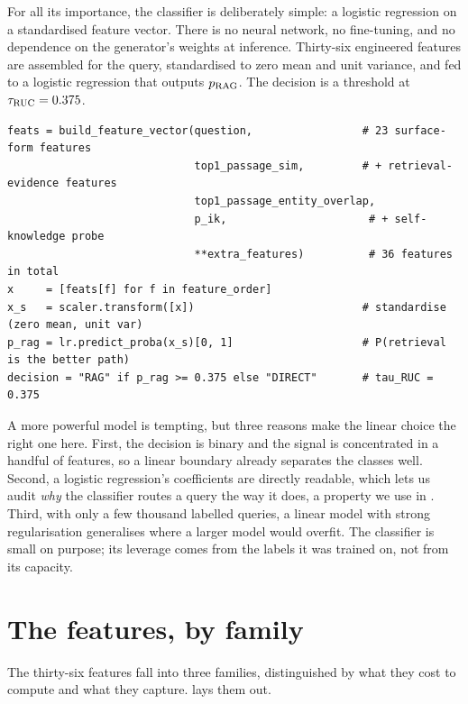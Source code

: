 For all its importance, the classifier is deliberately simple: a logistic regression
on a standardised feature vector. There is no neural network, no fine-tuning, and no
dependence on the generator's weights at inference. Thirty-six engineered features
are assembled for the query, standardised to zero mean and unit variance, and fed to
a logistic regression that outputs $p_{\text{RAG}}$. The decision is a threshold at
$\tau_{\text{RUC}} = 0.375$.

\begin{lstlisting}[caption={The classifier's prediction, condensed from \texttt{caem/routing/ruc.py}.}, label={lst:ruc-predict}]
feats = build_feature_vector(question,                 # 23 surface-form features
                             top1_passage_sim,         # + retrieval-evidence features
                             top1_passage_entity_overlap,
                             p_ik,                      # + self-knowledge probe
                             **extra_features)          # 36 features in total
x     = [feats[f] for f in feature_order]
x_s   = scaler.transform([x])                          # standardise (zero mean, unit var)
p_rag = lr.predict_proba(x_s)[0, 1]                    # P(retrieval is the better path)
decision = "RAG" if p_rag >= 0.375 else "DIRECT"       # tau_RUC = 0.375
\end{lstlisting}

\begin{intuition}
A more powerful model is tempting, but three reasons make the linear choice the right
one here. First, the decision is binary and the signal is concentrated in a handful
of features, so a linear boundary already separates the classes well. Second, a
logistic regression's coefficients are directly readable, which lets us audit
\emph{why} the classifier routes a query the way it does, a property we use in
. Third, with only a few thousand labelled queries, a linear model
with strong regularisation generalises where a larger model would overfit. The
classifier is small on purpose; its leverage comes from the labels it was trained on,
not from its capacity.
\end{intuition}

\section{The features, by family}
\label{sec:ruc-features}

The thirty-six features fall into three families, distinguished by what they cost to
compute and what they capture.  lays them out.

